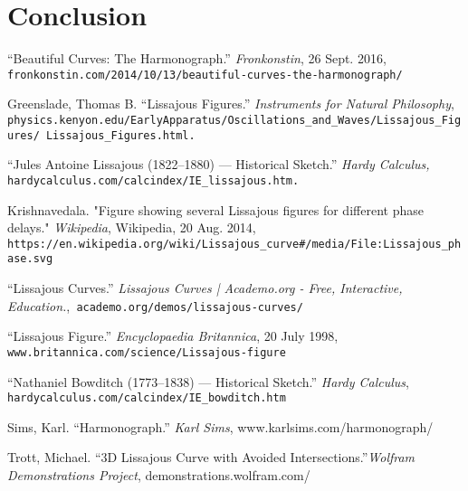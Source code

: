 \documentclass{article}
\begin{document}
\section{Conclusion}

\newpage
\begin{thebibliography}{9}
“Beautiful Curves: The Harmonograph.” \textit{Fronkonstin}, 26 Sept. 2016, \texttt{fronkonstin.com/2014/10/13/beautiful-curves-the-harmonograph/}

Greenslade, Thomas  B. “Lissajous Figures.” \textit{Instruments for Natural Philosophy}, \texttt{physics.kenyon.edu/EarlyApparatus/Oscillations\_and\_Waves/Lissajous\_Figures/
Lissajous\_Figures.html.}

“Jules Antoine Lissajous (1822--1880) --- Historical Sketch.” \textit{Hardy Calculus,}
\texttt{hardycalculus.com/calcindex/IE\_lissajous.htm.}

Krishnavedala. "Figure showing several Lissajous figures for different phase delays."
\textit{Wikipedia}, Wikipedia, 20 Aug. 2014, \texttt{https://en.wikipedia.org/wiki/Lissajous\_curve\#/media/File:Lissajous\_phase.svg}

“Lissajous Curves.” \textit{Lissajous Curves | Academo.org - Free, Interactive, Education.},\texttt{ academo.org/demos/lissajous-curves/}

“Lissajous Figure.” \textit{Encyclopaedia Britannica}, 20 July 1998, \texttt{www.britannica.com/science/Lissajous-figure}

“Nathaniel Bowditch (1773--1838) --- Historical Sketch.” \textit{Hardy Calculus}, \texttt{hardycalculus.com/calcindex/IE\_bowditch.htm}

Sims, Karl. “Harmonograph.” \textit{Karl Sims}, www.karlsims.com/harmonograph/

Trott, Michael. “3D Lissajous Curve with Avoided Intersections.”\textit{Wolfram Demonstrations Project}, demonstrations.wolfram.com/

\end{thebibliography}
\end{document}
